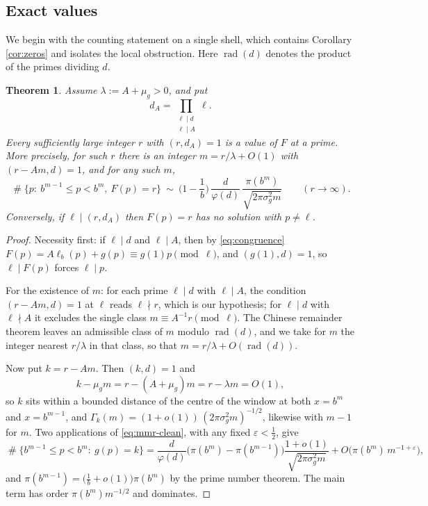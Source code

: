 \documentclass[11pt,reqno]{amsart}
\theoremstyle{plain}
\newtheorem{theorem}{Theorem}[section]
\theoremstyle{definition}
\DeclareMathOperator{\Card}{\#}
\DeclareMathOperator{\rad}{rad}
\begin{document}
\subsection{Exact values}
We begin with the counting statement on a single shell, which contains Corollary \ref{cor:zeros} and isolates the local obstruction. Here $\rad(d)$ denotes the product of the primes dividing $d$.

\begin{theorem}\label{thm:exact}
Assume $\lambda:=A+\mu_g>0$, and put
\[
d_A=\prod_{\substack{\ell\mid d\\ \ell\mid A}}\ell .
\]
Every sufficiently large integer $r$ with $(r,d_A)=1$ is a value of $F$ at a prime. More precisely, for such $r$ there is an integer $m=r/\lambda+O(1)$ with $(r-Am,d)=1$, and for any such $m$,
\begin{equation}\label{eq:exactcount}
\Card\{p:\ b^{m-1}\le p<b^{m},\ F(p)=r\}
\ \sim\ \Big(1-\frac1b\Big)\,\frac{d}{\varphi(d)}\,\frac{\pi(b^{m})}{\sqrt{2\pi\sigma_g^{2}m}}
\qquad(r\to\infty).
\end{equation}
Conversely, if $\ell\mid(r,d_A)$ then $F(p)=r$ has no solution with $p\ne\ell$.
\end{theorem}

\begin{proof}
Necessity first: if $\ell\mid d$ and $\ell\mid A$, then by \eqref{eq:congruence} $F(p)=A\ell_b(p)+g(p)\equiv g(1)p\pmod\ell$, and $(g(1),d)=1$, so $\ell\mid F(p)$ forces $\ell\mid p$.

For the existence of $m$: for each prime $\ell\mid d$ with $\ell\mid A$, the condition $(r-Am,d)=1$ at $\ell$ reads $\ell\nmid r$, which is our hypothesis; for $\ell\mid d$ with $\ell\nmid A$ it excludes the single class $m\equiv A^{-1}r\pmod\ell$. The Chinese remainder theorem leaves an admissible class of $m$ modulo $\rad(d)$, and we take for $m$ the integer nearest $r/\lambda$ in that class, so that $m=r/\lambda+O(\rad(d))$.

Now put $k=r-Am$. Then $(k,d)=1$ and
\[
k-\mu_g m=r-(A+\mu_g)m=r-\lambda m=O(1),
\]
so $k$ sits within a bounded distance of the centre of the window at both $x=b^m$ and $x=b^{m-1}$, and $\Gamma_k(m)=(1+o(1))\,(2\pi\sigma_g^{2}m)^{-1/2}$, likewise with $m-1$ for $m$. Two applications of \eqref{eq:mmr-clean}, with any fixed $\varepsilon<\tfrac12$, give
\[
\Card\{b^{m-1}\le p<b^{m}:\ g(p)=k\}
=\frac{d}{\varphi(d)}\big(\pi(b^{m})-\pi(b^{m-1})\big)\frac{1+o(1)}{\sqrt{2\pi\sigma_g^{2}m}}
+O\big(\pi(b^{m})\,m^{-1+\varepsilon}\big),
\]
and $\pi(b^{m-1})=\big(\tfrac1b+o(1)\big)\pi(b^m)$ by the prime number theorem. The main term has order $\pi(b^m)m^{-1/2}$ and dominates.
\end{proof}
\end{document}
